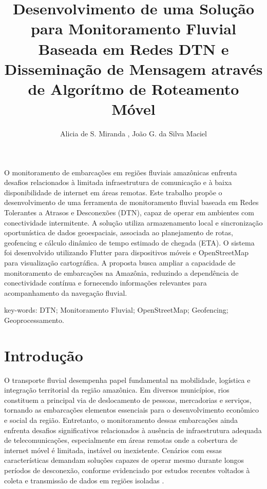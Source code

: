 \documentclass[12pt]{article}
\title{Desenvolvimento de uma Solução para Monitoramento Fluvial Baseada em Redes DTN e Disseminação de Mensagem através de Algorítmo de Roteamento Móvel}
\author{Alicia de S. Miranda \inst{1}, João G. da Silva Maciel\inst{2}}
\begin{document}
\maketitle

\begin{resumo}
O monitoramento de embarcações em regiões fluviais amazônicas enfrenta desafios relacionados à limitada infraestrutura de comunicação e à baixa disponibilidade de internet em áreas remotas. Este trabalho propõe o desenvolvimento de uma ferramenta de monitoramento fluvial baseada em Redes Tolerantes a Atrasos e Desconexões (DTN), capaz de operar em ambientes com conectividade intermitente. A solução utiliza armazenamento local e sincronização oportunística de dados geoespaciais, associada ao planejamento de rotas, geofencing e cálculo dinâmico de tempo estimado de chegada (ETA). O sistema foi desenvolvido utilizando Flutter para dispositivos móveis e OpenStreetMap para visualização cartográfica. A proposta busca ampliar a capacidade de monitoramento de embarcações na Amazônia, reduzindo a dependência de conectividade contínua e fornecendo informações relevantes para acompanhamento da navegação fluvial.
\end{resumo}

key-words: DTN; Monitoramento Fluvial; OpenStreetMap; Geofencing; Geoprocessamento.

\section{Introdução}
O transporte fluvial desempenha papel fundamental na mobilidade, logística e integração territorial da região amazônica. Em diversos municípios, rios constituem a principal via de deslocamento de pessoas, mercadorias e serviços, tornando as embarcações elementos essenciais para o desenvolvimento econômico e social da região. Entretanto, o monitoramento dessas embarcações ainda enfrenta desafios significativos relacionados à ausência de infraestrutura adequada de telecomunicações, especialmente em áreas remotas onde a cobertura de internet móvel é limitada, instável ou inexistente. Cenários com essas características demandam soluções capazes de operar mesmo durante longos períodos de desconexão, conforme evidenciado por estudos recentes voltados à coleta e transmissão de dados em regiões isoladas \cite{floatingblue2024}.
\end{document}

